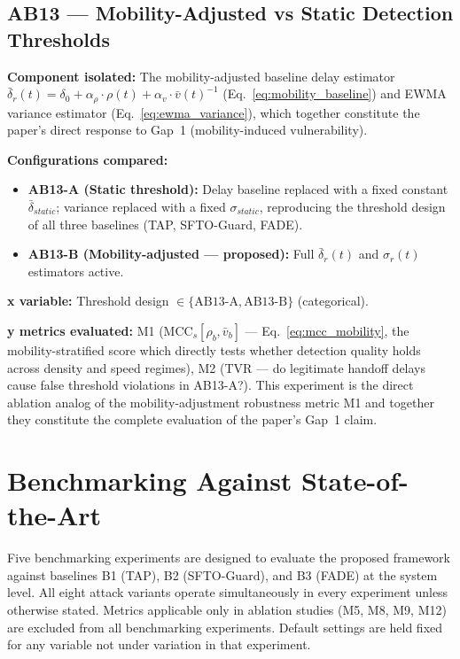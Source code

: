 \documentclass[12pt, a4paper]{report}
\begin{document}
{{\subsection{AB13 — Mobility-Adjusted vs Static
Detection Thresholds}
\label{sec:ab13}

\textbf{Component isolated:}
The mobility-adjusted baseline delay estimator
$\bar{\delta}_r(t) = \delta_0 + \alpha_\rho \cdot
\rho(t) + \alpha_v \cdot \bar{v}(t)^{-1}$
(Eq.~\ref{eq:mobility_baseline}) and \ac{EWMA}
variance estimator (Eq.~\ref{eq:ewma_variance}),
which together constitute the paper's direct
response to Gap~1 (mobility-induced vulnerability).

\textbf{Configurations compared:}
\begin{itemize}
    \item \textbf{AB13-A (Static threshold):}
    Delay baseline replaced with a fixed constant
    $\bar{\delta}_{static}$; variance replaced
    with a fixed $\sigma_{static}$, reproducing
    the threshold design of all three baselines
    (TAP, SFTO-Guard, FADE).
    \item \textbf{AB13-B (Mobility-adjusted —
    proposed):} Full $\bar{\delta}_r(t)$ and
    $\sigma_r(t)$ estimators active.
\end{itemize}

\textbf{x variable:} Threshold design
$\in \{\text{AB13-A}, \text{AB13-B}\}$ (categorical).

\textbf{y metrics evaluated:} M1
($\text{MCC}_s[\rho_b, \bar{v}_b]$ —
Eq.~\ref{eq:mcc_mobility}, the mobility-stratified
score which directly tests whether detection quality
holds across density and speed regimes), M2 (TVR —
do legitimate handoff delays cause false threshold
violations in AB13-A?). This experiment is the
direct ablation analog of the mobility-adjustment
robustness metric M1 and together they constitute
the complete evaluation of the paper's Gap~1 claim.

\section{Benchmarking Against State-of-the-Art}
\label{sec:benchmarking}

Five benchmarking experiments are designed to evaluate
the proposed framework against baselines B1 (TAP),
B2 (SFTO-Guard), and B3 (FADE) at the system level.
All eight attack variants operate simultaneously in
every experiment unless otherwise stated. Metrics
applicable only in ablation studies (M5, M8, M9, M12)
are excluded from all benchmarking experiments.
Default settings are held fixed for any variable not
under variation in that experiment.

}}
\end{document}
